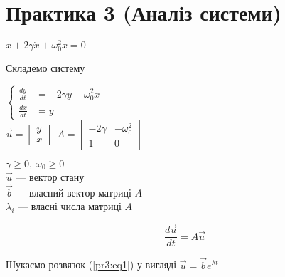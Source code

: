 \section{Практика 3 (Аналіз системи)}

$\ddot{x} + 2\gamma\dot{x} +\omega_0^2x = 0$

Складемо систему

\begin{minipage}{0.40\textwidth}
    $\left\{\begin{aligned}
        \frac{dy}{dt} &= -2\gamma y - \omega_0^2x \\
        \frac{dx}{dt} &= y
    \end{aligned}\right.$
    \\[2mm]
    $\overrightarrow{u} = \begin{bmatrix} y\\x \end{bmatrix} \ \ 
    A = \begin{bmatrix}
        -2\gamma & -\omega_0^2 \\
        1 & 0
    \end{bmatrix}$ 
\end{minipage}
\begin{minipage}{0.49\textwidth}
    $\gamma \ge 0, \ \omega_0 \ge 0$\\[2mm]
    $\overrightarrow{u}$ --- вектор стану\\
    $\overrightarrow{b} $ --- власний вектор матриці $A$\\
    $\lambda_i$ --- власні числа матриці $A$\\[1mm]
\end{minipage}

\begin{equation}\label{pr3:eq1}
    \frac{d\overrightarrow{u}}{dt} = A\overrightarrow{u}
\end{equation}


Шукаємо розвязок (\ref{pr3:eq1}) у вигляді $\overrightarrow{u} = \overrightarrow{b}e^{\lambda t}$











